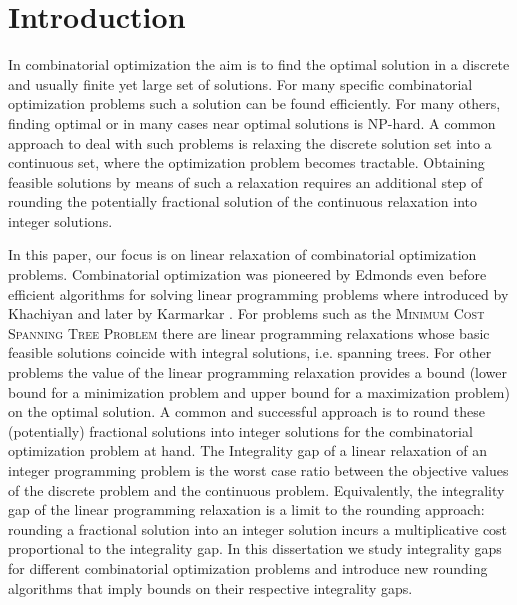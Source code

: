 \nocite{IPbook}
\section{Introduction}\label{chapter:intro}

In combinatorial optimization the aim is to find the optimal solution in a discrete and
usually finite yet large set of solutions. For many specific combinatorial optimization problems such a solution can be found efficiently. For many others, finding optimal or in many cases near optimal solutions is NP-hard. A common approach to deal with such problems is relaxing the discrete solution set into a continuous set, where the optimization problem becomes tractable. Obtaining feasible solutions by means of such a relaxation requires an additional step of rounding the potentially fractional solution of the continuous relaxation into integer solutions.

In this paper, our focus is on linear relaxation of combinatorial
optimization problems. Combinatorial optimization was pioneered by Edmonds even before efficient algorithms for solving linear programming problems where introduced by Khachiyan \cite{Khachiyan} and later by Karmarkar \cite{Karmarkar1984}. For problems such as the \textsc{Minimum Cost Spanning Tree Problem} there are linear programming relaxations whose basic feasible solutions coincide with  integral solutions, i.e. spanning trees. For other problems the value of the linear programming relaxation provides a bound (lower bound for a minimization problem and upper bound for a maximization problem) on the optimal solution. A common and successful approach is to round these (potentially) fractional solutions into integer solutions for the combinatorial optimization problem at hand. The Integrality gap of a linear relaxation of an integer programming problem is the worst case ratio between the objective values of the discrete problem and the continuous problem. Equivalently, the integrality gap of the linear programming relaxation is a limit to the rounding approach: rounding a fractional solution into an integer solution incurs
a multiplicative cost proportional to the integrality gap. In this dissertation we study integrality gaps for different combinatorial optimization problems and introduce new rounding algorithms that imply bounds on their respective integrality gaps. 

